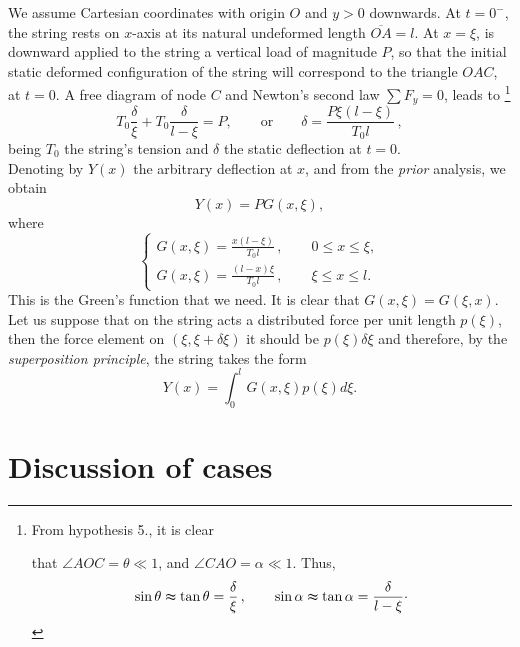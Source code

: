 \documentclass[12pt]{article}
\begin{document}
We assume Cartesian coordinates with origin $O$ and $y>0$ downwards. At $t=0^-$, the string rests on $x$-axis at its natural undeformed length $\overline{OA}=l$. At $x=\xi$, is downward applied to the string a vertical load of magnitude $P$, so that the initial static deformed configuration of the string will correspond to the triangle $OAC$, at $t=0$. A free diagram of node $C$ and Newton's second law $\sum F_y = 0$, leads to {\footnote{From hypothesis 5., it is clear 

that $\angle{AOC}=\theta\ll 1$, and $\angle{CAO}=\alpha\ll 1$. Thus,
\begin{equation*}
\sin\theta\thickapprox\tan\theta=\frac{\delta}{\xi}\,, \qquad \sin\alpha\thickapprox\tan\alpha=\frac{\delta}{l-\xi}\cdot
\end{equation*}}}  
\begin{equation*}
T_0\frac{\delta}{\xi}+T_0\frac{\delta}{l-\xi}=P, \qquad \textrm{or} \qquad \delta=\frac{P\xi(l-\xi)}{T_0l}\,,
\end{equation*}
being $T_0$ the string's tension and $\delta$ the static deflection at $t=0$. \\
Denoting by $Y(x)$ the arbitrary deflection at $x$, and from the \emph{prior} analysis, we obtain
\begin{equation*}
Y(x)=PG(x,\xi),
\end{equation*} 
where
\begin{equation}
\begin{cases}
G(x,\xi)=\frac{x(l-\xi)}{T_0l}\,, \qquad 0\leq x\leq\xi, \\
G(x,\xi)=\frac{(l-x)\xi}{T_0l}\,, \qquad \xi\leq x\leq l.
\end{cases}
\end{equation}
This is the Green's function that we need. It is clear that $G(x,\xi)=G(\xi,x)$. Let us suppose that on the string acts a distributed force per unit length $p(\xi)$, then the force element on $(\xi,\xi+\delta\xi)$ it should be $p(\xi)\delta\xi$ and therefore, by the \emph{superposition principle}, the string takes the form
\begin{equation*}
Y(x)=\int_0^l G(x,\xi)p(\xi)d\xi.
\end{equation*}
\section{Discussion of cases}
\end{document}
